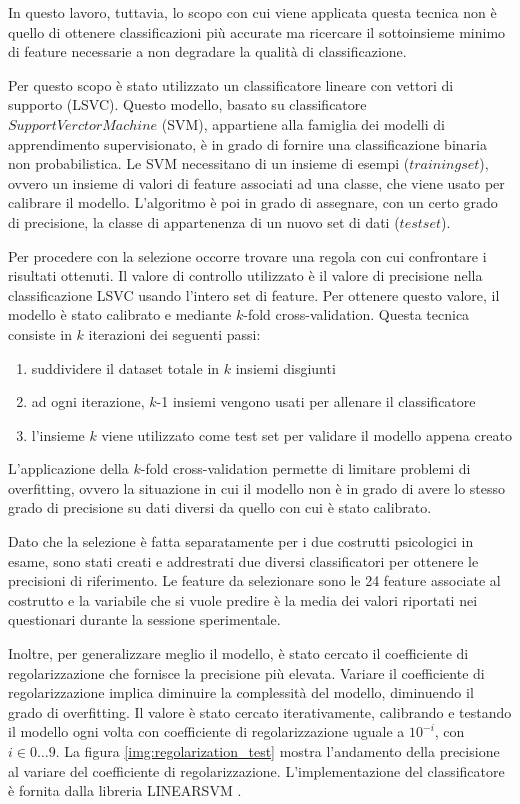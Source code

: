 In questo lavoro, tuttavia, lo scopo con cui viene applicata questa tecnica non è quello di ottenere classificazioni più accurate ma ricercare il sottoinsieme minimo di feature necessarie a non degradare la qualità di classificazione.

Per questo scopo è stato utilizzato un classificatore lineare con vettori di supporto (LSVC). Questo modello, basato su classificatore $Support Verctor Machine$ (SVM), appartiene alla famiglia dei modelli di apprendimento supervisionato, è in grado di fornire una classificazione binaria non probabilistica. Le SVM necessitano di un insieme di esempi ($training set$), ovvero un insieme di valori di feature associati ad una classe, che viene usato per calibrare il modello. L'algoritmo è poi in grado di assegnare, con un certo grado di precisione, la classe di appartenenza di un nuovo set di dati ($test set$).

Per procedere con la selezione occorre trovare una regola con cui confrontare i risultati ottenuti. Il valore di controllo utilizzato è il valore di precisione nella classificazione LSVC usando l'intero set di feature. Per ottenere questo valore, il modello è stato calibrato e mediante $k$-fold cross-validation. Questa tecnica consiste in $k$ iterazioni dei seguenti passi:
\begin{enumerate}
    \item suddividere il dataset totale in $k$ insiemi disgiunti
    \item ad ogni iterazione, $k$-1 insiemi vengono usati per allenare il classificatore
    \item l'insieme $k$ viene utilizzato come test set per validare il modello appena creato
\end{enumerate}
L'applicazione della $k$-fold cross-validation permette di limitare problemi di overfitting, ovvero la situazione in cui il modello non è in grado di avere lo stesso grado di precisione su dati diversi da quello con cui è stato calibrato.

Dato che la selezione è fatta separatamente per i due costrutti psicologici in esame, sono stati creati e addrestrati due diversi classificatori per ottenere le precisioni di riferimento. Le feature da selezionare sono le 24 feature associate al costrutto e la variabile che si vuole predire è la media dei valori riportati nei questionari durante la sessione sperimentale.

Inoltre, per generalizzare meglio il modello, è stato cercato il coefficiente di regolarizzazione che fornisce la precisione più elevata. Variare il coefficiente di regolarizzazione implica diminuire la complessità del modello, diminuendo il grado di overfitting. Il valore è stato cercato iterativamente, calibrando e testando il modello ogni volta con coefficiente di regolarizzazione uguale a $10^{-i}$, con $i\in{0\dots9}$. La figura \ref{img:regolarization_test} mostra l'andamento della precisione al variare del coefficiente di regolarizzazione. L'implementazione del classificatore è fornita dalla libreria LINEARSVM \cite{fan2008liblinear}.

